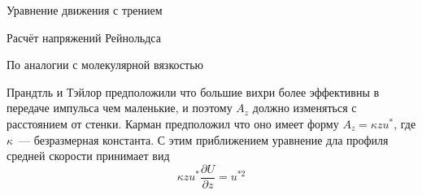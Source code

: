 \begin{chapter}{Уравнение движения с трением}
\begin{section}{Расчёт напряжений Рейнольдса}
\begin{paragraph}{По аналогии с молекулярной вязкостью}
%
%

Прандтль и Тэйлор предположили что большие вихри более эффективны в
передаче импульса чем маленькие, и поэтому $A_z$ должно изменяться с
расстоянием от стенки. Карман предположил что оно имеет форму 
$A_z = \kappa z u^*$, где $\kappa$~--- безразмерная константа. С этим
приближением уравнение дла профиля средней скорости принимает вид
\begin{equation}
\kappa z u^* \frac{\partial U}{\partial z} = u^{*2}
\end{equation}
%


\end{paragraph}
\end{section}
\end{chapter}
